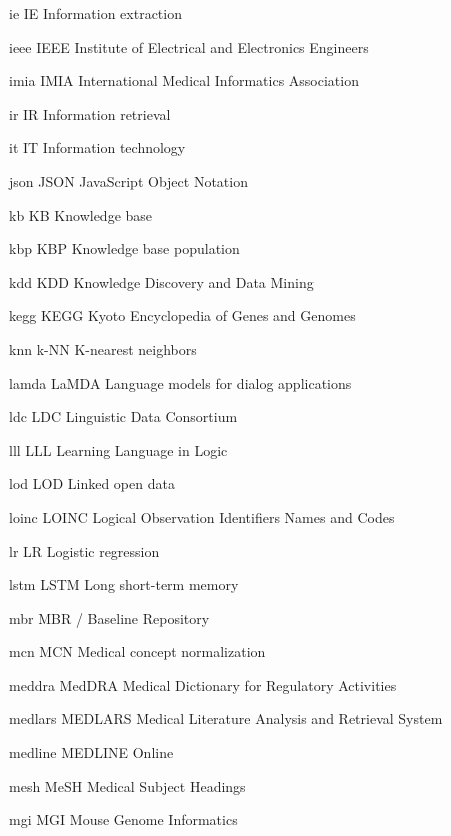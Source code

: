 \newabbreviation
{ie}
{IE}
{Information extraction}

\newabbreviation
{ieee}
{IEEE}
{Institute of Electrical and Electronics Engineers}

\newabbreviation
{imia}
{IMIA}
{International Medical Informatics Association}

\newabbreviation
{ir}
{IR}
{Information retrieval}

\newabbreviation
{it}
{IT}
{Information technology}

\newabbreviation
{json}
{JSON}
{JavaScript Object Notation}

\newabbreviation
{kb}
{KB}
{Knowledge base}

\newabbreviation
{kbp}
{KBP}
{Knowledge base population}

\newabbreviation
{kdd}
{KDD}
{Knowledge Discovery and Data Mining}

\newabbreviation
{kegg}
{KEGG}
{Kyoto Encyclopedia of Genes and Genomes}

\newabbreviation
{knn}
{k-NN}
{K-nearest neighbors}

\newabbreviation
{lamda}
{LaMDA}
{Language models for dialog applications}

\newabbreviation
{ldc}
{LDC}
{Linguistic Data Consortium}

\newabbreviation
{lll}
{LLL}
{Learning Language in Logic}

\newabbreviation
{lod}
{LOD}
{Linked open data}

\newabbreviation
{loinc}
{LOINC}
{Logical Observation Identifiers Names and Codes}

\newabbreviation
{lr}
{LR}
{Logistic regression}

\newabbreviation
{lstm}
{LSTM}
{Long short-term memory}

\newabbreviation
{mbr}
{MBR}
{/ Baseline Repository}

\newabbreviation
{mcn}
{MCN}
{Medical concept normalization}

\newabbreviation
{meddra}
{MedDRA}
{Medical Dictionary for Regulatory Activities}

\newabbreviation
{medlars}
{MEDLARS}
{Medical Literature Analysis and Retrieval System}

\newabbreviation
{medline}
{MEDLINE}
{ Online}

\newabbreviation
{mesh}
{MeSH}
{Medical Subject Headings}

\newabbreviation
{mgi}
{MGI}
{Mouse Genome Informatics}

